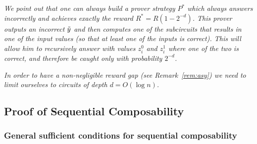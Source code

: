 \begin{remark}
\label{rem:match}
{\em 
We point out that one can always build a prover strategy 
$P^*$ which always answers incorrectly and achieves exactly the reward 
$R^*=R(1-2^{-d})$. This prover outputs an incorrect 
$\tilde{y}$ and then computes one of the subcircuits that results in one of the input values (so that at least one of the inputs is correct). This will allow him to recursively answer with values $z^0_i$ and $z^1_i$ where one of the two is correct, and therefore be caught only with probability $2^{-d}$.
}
\end{remark}

\begin{remark}
\label{rem:logd}
{\em 
In order to have a non-negligible reward gap (see Remark~\ref{rem:asy}) we need
to limit ourselves to circuits of depth $d=O(\log n)$. 
}
\end{remark}

\subsection{Proof of Sequential Composability}
\label{sec:proof-comp}

\subsubsection{General sufficient conditions for sequential composability}


